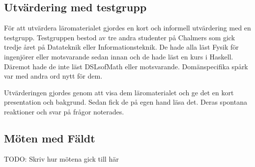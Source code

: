 \begin{draft}

\section{Utvärdering med testgrupp}


För att utvärdera läromaterialet gjordes en kort och informell utvärdering med en testgrupp. Testgruppen bestod av tre andra studenter på Chalmers som gick tredje året på Datateknik eller Informationsteknik. De hade alla läst Fysik för ingenjörer eller motsvarande sedan innan och de hade läst en kurs i Haskell. Däremot hade de inte läst DSLsofMath eller motsvarande. Domänspecifika spårk var med andra ord nytt för dem.

Utvärderingen gjordes genom att visa dem läromaterialet och ge det en kort presentation och bakgrund. Sedan fick de på egen hand läsa det. Deras spontana reaktioner och svar på frågor noterades.

\end{draft}

\begin{binge}

\section{Möten med Fäldt}

TODO: Skriv hur mötena gick till här

\end{binge}
























